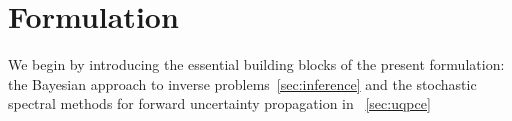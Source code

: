 \section{Formulation}
\label{sec:formu}
We begin by introducing the essential building blocks of the present formulation: 
the Bayesian approach to inverse problems~\ref{sec:inference}
and the stochastic spectral methods for forward uncertainty propagation in ~\ref{sec:uqpce}


